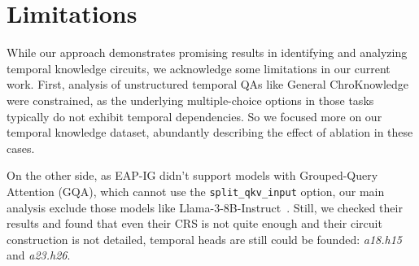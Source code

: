\section*{Limitations}
While our approach demonstrates promising results in identifying and analyzing temporal knowledge circuits, we acknowledge some limitations in our current work. 
First, analysis of unstructured temporal QAs like General ChroKnowledge~\citep{chroknowledge} were constrained, as the underlying multiple-choice options in those tasks typically do not exhibit temporal dependencies.
So we focused more on our temporal knowledge dataset, abundantly describing the effect of ablation in these cases.

On the other side, as EAP-IG didn't support models with Grouped-Query Attention (GQA), which cannot use the \texttt{split\_qkv\_input} option, our main analysis exclude those models like Llama-3-8B-Instruct~\citep{llama3}.
Still, we checked their results and found that even their CRS is not quite enough and their circuit construction is not detailed, temporal heads are still could be founded: \emph{a18.h15} and \emph{a23.h26}.
